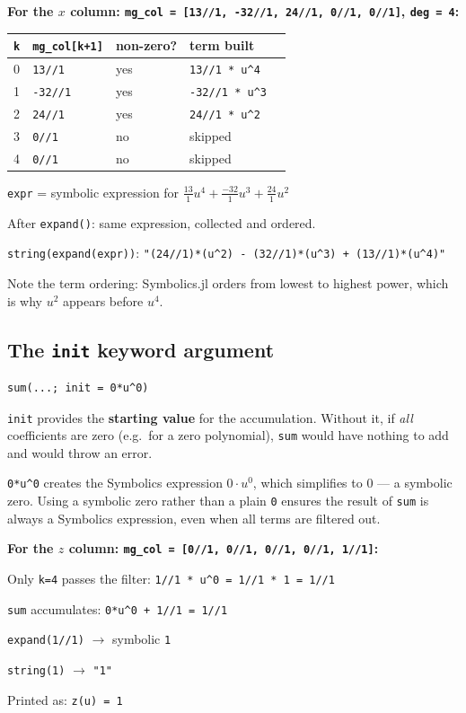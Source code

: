 \documentclass[12pt, a4paper]{article}
\newcommand{\cd}[1]{\texttt{#1}}
\begin{document}
\begin{examplebox}
\textbf{For the $x$ column: \cd{mg\_col = [13//1, -32//1, 24//1, 0//1, 0//1]},
\cd{deg = 4}:}

\medskip
\begin{tabular}{lllll}
\toprule
\cd{k} & \cd{mg\_col[k+1]} & non-zero? & term built \\
\midrule
0 & \cd{13//1}  & yes & \cd{13//1 * u\^{}4} \\
1 & \cd{-32//1} & yes & \cd{-32//1 * u\^{}3} \\
2 & \cd{24//1}  & yes & \cd{24//1 * u\^{}2} \\
3 & \cd{0//1}   & no  & skipped \\
4 & \cd{0//1}   & no  & skipped \\
\bottomrule
\end{tabular}

\medskip
\cd{expr} = symbolic expression for
$\frac{13}{1}u^4 + \frac{-32}{1}u^3 + \frac{24}{1}u^2$

After \cd{expand()}: same expression, collected and ordered.

\cd{string(expand(expr))}:
\cd{"(24//1)*(u\^{}2) - (32//1)*(u\^{}3) + (13//1)*(u\^{}4)"}

Note the term ordering: Symbolics.jl orders from lowest to
highest power, which is why $u^2$ appears before $u^4$.
\end{examplebox}

\subsection{The \texttt{init} keyword argument}

\begin{verbatim}
sum(...; init = 0*u^0)
\end{verbatim}

\cd{init} provides the \textbf{starting value} for the
accumulation.
Without it, if \emph{all} coefficients are zero (e.g.\ for
a zero polynomial), \cd{sum} would have nothing to add and
would throw an error.

\cd{0*u\^{}0} creates the Symbolics expression $0 \cdot u^0$,
which simplifies to $0$ --- a symbolic zero.
Using a symbolic zero rather than a plain \cd{0} ensures
the result of \cd{sum} is always a Symbolics expression,
even when all terms are filtered out.

\begin{examplebox}
\textbf{For the $z$ column: \cd{mg\_col = [0//1, 0//1, 0//1, 0//1, 1//1]}:}

\medskip
Only \cd{k=4} passes the filter:
\cd{1//1 * u\^{}0 = 1//1 * 1 = 1//1}

\cd{sum} accumulates: \cd{0*u\^{}0 + 1//1 = 1//1}

\cd{expand(1//1)} $\to$ symbolic \cd{1}

\cd{string(1)} $\to$ \cd{"1"}

Printed as: \cd{z(u)  =  1}
\end{examplebox}
\end{document}
